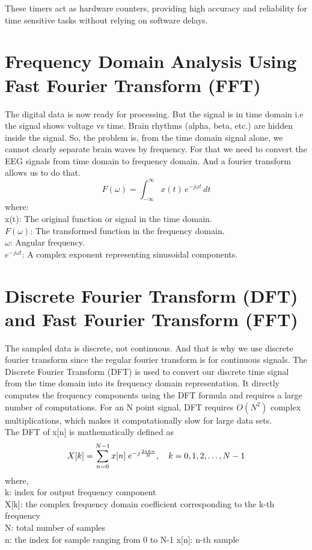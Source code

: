 \noindent These timers act as hardware counters, providing high accuracy and reliability for time sensitive tasks without relying on software delays.


\section{Frequency Domain Analysis Using Fast Fourier Transform (FFT)}
The digital data is now ready for processing. But the signal is in time domain i.e the signal shows voltage vs time. Brain rhythms (alpha, beta, etc.) are hidden inside the signal. So, the problem is, from the time domain signal alone, we cannot clearly separate brain waves by frequency. For that we need to convert the EEG signals from time domain to frequency domain. And a fourier transform allows us to do that. 
\begin{equation}
	F(\omega) = \int_{-\infty}^{\infty} x(t)\, e^{-j \omega t} \, dt
\end{equation}
where:\\
x(t): The original function or signal in the time domain.\\
$F(\omega)$: The transformed function in the frequency domain.\\
$\omega$: Angular frequency.\\
$e^{-j \omega t}$: A complex exponent representing sinusoidal components.
\section{Discrete Fourier Transform (DFT) and Fast Fourier Transform (FFT)}
The sampled data is discrete, not continuous. And that is why we use discrete fourier transform since the regular fourier transform is for continuous signals. The Discrete Fourier Transform (DFT) is used to convert our discrete time signal from the time domain into its frequency domain representation. It directly computes the frequency components using the DFT formula and requires a large number of computations. For an N point signal, DFT requires $O(N^2)$ complex multiplications, which makes it computationally slow for large data sets.\\The DFT of x[n] is mathematically defined as\\
\begin{equation}
	X[k] = \sum_{n=0}^{N-1} x[n]\; e^{-j \frac{2\pi k n}{N}},\\
	\quad k = 0,1,2,\ldots, N-1
\end{equation}
where,\\
k: index for output frequency component\\
X[k]: the complex frequency domain coefficient corresponding to the k-th frequency\\
N: total number of samples \\
n: the index for sample ranging from 0 to N-1 
x[n]:  n-th sample\\

